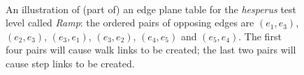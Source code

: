 \documentclass[10pt,twocolumn]{article}
\newenvironment{stusubfig}[1]
{
	\begin{figure}[#1]
	\begin{center}
}
{
	\end{center}
	\end{figure}
}
\begin{document}
\begin{stusubfig}{!t}
	\hspace{4mm}%
	\\
\caption{An illustration of (part of) an edge plane table for the \emph{hesperus} test level called \emph{Ramp}: the ordered pairs of opposing edges are $(e_1,e_3)$, $(e_2,e_3)$, $(e_3,e_1)$, $(e_3,e_2)$, $(e_4,e_5)$ and $(e_5,e_4)$. The first four pairs will cause walk links to be created; the last two pairs will cause step links to be created.}
\label{fig:edgeplanetable}
\end{stusubfig}
\end{document}

